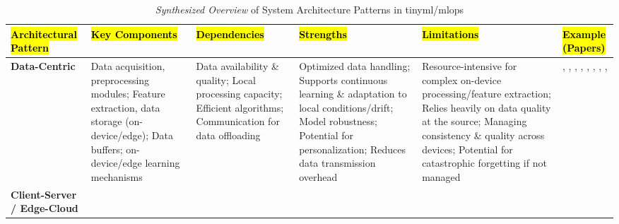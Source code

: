 \begin{landscape}
    \begin{table}[htbp]
        \caption[Overview of System Architecture Patterns]{\emph{Synthesized Overview} of System Architecture Patterns in \gls{tinyml}/\gls{mlops}}
        \label{tab:architectural_patterns_overview}
        \scriptsize
        \renewcommand{\arraystretch}{1.2}
        \setlength{\tabcolsep}{4pt} %
        \begin{tabularx}{\linewidth}{@{} >{\RaggedRight\bfseries\arraybackslash}X %
                                     >{\RaggedRight\arraybackslash}X
                                     >{\RaggedRight\arraybackslash}X
                                     >{\RaggedRight\arraybackslash}X
                                     >{\RaggedRight\arraybackslash}X
                                     >{\RaggedRight\arraybackslash}X @{}}
            \toprule
            \hl{\footnotesize\textbf{Architectural Pattern}} &
            \hl{\footnotesize\textbf{Key Components}} &
            \hl{\footnotesize\textbf{Dependencies}} &
            \hl{\footnotesize\textbf{Strengths}} &
            \hl{\footnotesize\textbf{Limitations}} &
            \hl{\footnotesize\textbf{Example (Papers)}} \\
            \midrule
            Data-Centric & 
                Data acquisition, preprocessing modules; Feature extraction, data storage (on-device/edge); Data buffers; on-device/edge learning mechanisms &
                Data availability \& quality; Local processing capacity; Efficient algorithms; Communication for data offloading &
                Optimized data handling; Supports continuous learning \& adaptation to local conditions/drift; Model robustness; Potential for personalization; Reduces data transmission overhead &
                Resource-intensive for complex on-device processing/feature extraction; Relies heavily on data quality at the source; Managing consistency \& quality across devices; Potential for catastrophic forgetting if not managed &
                \cite{banburyEdgeImpulseMLOps2023}, \cite{disabatoIncrementalOnDeviceTiny2020}, \cite{renOndeviceOnlineLearning2024}, \cite{sudharsanEdge2TrainFrameworkTrain2020}, \cite{moskalenkoResilienceawareMLOpsResourceconstrained2023}, \cite{pavanTyBoxAutomaticDesign2024}, \cite{grauOnDeviceTrainingMachine2021}, \cite{fraidlingTinyMachineLearning2023}, \cite{demaghSensOLMemoryEfficientOnline2024} \\
            \midrule
            Client-Server / Edge-Cloud &

\end{tabularx}
\end{table}
\end{landscape}
